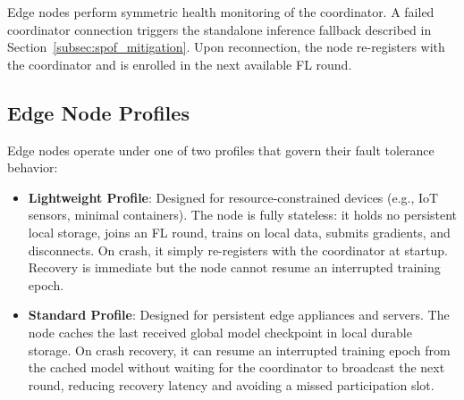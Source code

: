 Edge nodes perform symmetric health monitoring of the coordinator. A failed
coordinator connection triggers the standalone inference fallback described in
Section~\ref{subsec:spof_mitigation}. Upon reconnection, the node re-registers with
the coordinator and is enrolled in the next available FL round.

\subsection{Edge Node Profiles}
\label{subsec:ft_node_profiles}

Edge nodes operate under one of two profiles that govern their fault tolerance
behavior:

\begin{itemize}
    \item \textbf{Lightweight Profile}: Designed for resource-constrained devices
    (e.g., IoT sensors, minimal containers). The node is fully stateless: it holds no
    persistent local storage, joins an FL round, trains on local data, submits
    gradients, and disconnects. On crash, it simply re-registers with the coordinator
    at startup. Recovery is immediate but the node cannot resume an interrupted
    training epoch.

    \item \textbf{Standard Profile}: Designed for persistent edge appliances and
    servers. The node caches the last received global model checkpoint in local 
    durable storage. On crash recovery, it can resume an interrupted training epoch 
    from the cached model without waiting for the coordinator to broadcast the next 
    round, reducing recovery latency and avoiding a missed participation slot.
\end{itemize}
